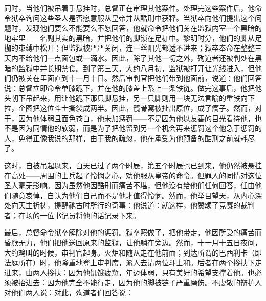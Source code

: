同时，当他们被吊着手悬挂时，总督正在审理其他案件。处理完这些案件后，他命令狱卒询问这些圣人是否愿意服从皇帝并从酷刑中获释。当狱卒向他们提出这个问题时，发现他们要么不能要么不愿回答，他就命令把他们关在监狱内室一个黑暗的地牢里——名副其实的黑暗，并把他们的脚锁在足枷中。黎明时分，他们的脚从足枷的束缚中松开；但监狱被严严关闭，连一丝阳光都透不进来；狱卒奉命在整整三天内不给他们一点面包或一滴水。因此，除了其他一切之外，殉道者还被判处在黑暗的监狱中并长期禁食。到了第三天，大约八月初，监狱被打开让光线进入，但他们仍被关在里面直到十一月十日。然后审判官把他们带到他面前，说道：他们回答说：总督立即命令单膝跪下，并在他的膝盖上系上一条铁链。做完这事后，他把他头朝下吊起来，用让他跪下那只脚悬挂，另一只脚则用一块无法言喻的重铁向下拉，企图把这位斗士撕裂成两半。因此，髋骨窝被扯出原位，成了瘸子。然而，对于，因为他体弱且面色苍白，他未加惩罚——不是因为他以友善的目光看待他，也不是因为同情他的软弱，而是为了把他留到另一个机会再来惩罚这个他急于惩罚的人，免得正像我说的那样，由于我的疏忽，他在承受为他预备的酷刑之前就耗尽了。\par

这时，自被吊起以来，白天已过了两个时辰，第五个时辰也已到来，他仍然被悬挂在高处——周围的士兵起了怜悯之心，劝他服从皇帝的命令。但罪人的同情对这位圣人毫无影响。因为虽然他因酷刑而痛苦不堪，但他没有给他们任何回答，任由他们随意哀悼，自认为他们自己而不是他才值得怜悯。然而，他举目望天，从内心深处向天主祈祷，提醒祂古时所行的奇事：他说道：就这样，他赞颂了竞赛的裁判者；在场的一位书记员将他的话记录下来。\par

最后，总督命令狱卒解除对他的惩罚。狱卒照做了，把他带走，他因所受的痛苦而昏厥无力，他们把他送回原来的监狱，让他躺在旁边。然而，十一月十五日夜间，大约鸡叫的时候，审判官起身。火炬和随从走在他前面；到达所谓的巴西利卡（即法庭所在）时，他隆重地登上审判席，派人去请两位斗士和。后者在两个搀扶下走进来，由两人搀扶：因为他饥饿疲惫，年迈体弱，只有美好的希望支撑着他。也必须被抬进去：因为他完全不能行走，因为他的脚被链子严重磨伤。不虔敬的辩护人对他们两人说：对此，殉道者们回答说：\par

